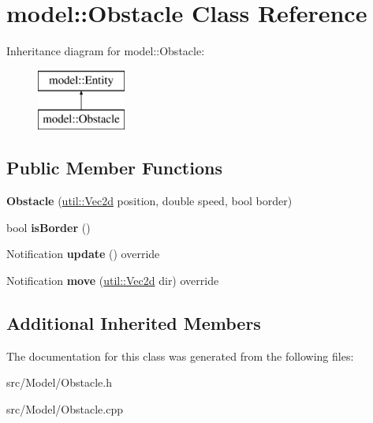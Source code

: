 \hypertarget{classmodel_1_1_obstacle}{}\section{model\+:\+:Obstacle Class Reference}
\label{classmodel_1_1_obstacle}
Inheritance diagram for model\+:\+:Obstacle\+:\begin{figure}[H]
\begin{center}
\leavevmode
\includegraphics[height=2.000000cm]{d1/dfb/classmodel_1_1_obstacle}
\end{center}
\end{figure}
\subsection*{Public Member Functions}
\begin{DoxyCompactItemize}
\item 
\mbox{\label{classmodel_1_1_obstacle_a27789fe24ccf5a0128343eddab253af1}} 
{\bfseries Obstacle} (\mbox{\hyperlink{classutil_1_1_vec2}{util\+::\+Vec2d}} position, double speed, bool border)
\item 
\mbox{\label{classmodel_1_1_obstacle_a3853ca7a68d6b145c0604cdb90283d5e}} 
bool {\bfseries is\+Border} ()
\item 
\mbox{\label{classmodel_1_1_obstacle_a864d84a166e070f686a2b913b773fa66}} 
Notification {\bfseries update} () override
\item 
\mbox{\label{classmodel_1_1_obstacle_a049f36109d34e3baeb760954e603d61a}} 
Notification {\bfseries move} (\mbox{\hyperlink{classutil_1_1_vec2}{util\+::\+Vec2d}} dir) override
\end{DoxyCompactItemize}
\subsection*{Additional Inherited Members}


The documentation for this class was generated from the following files\+:\begin{DoxyCompactItemize}
\item 
src/\+Model/Obstacle.\+h\item 
src/\+Model/Obstacle.\+cpp\end{DoxyCompactItemize}
